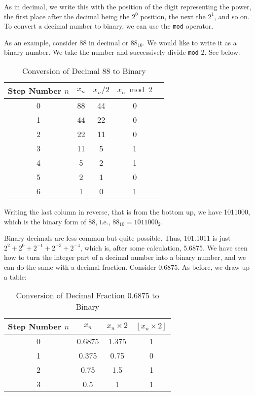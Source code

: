 As in decimal, we write this with the position of the digit representing the power, the first place after the decimal being the $2^0$ position, the next the $2^1$, and so on. To convert a decimal number to binary, we can use the \texttt{mod} operator.

As an example, consider 88 in decimal or $88_{10}$. We would like to write it as a binary number. We take the number and successively divide \texttt{mod} 2. See below:

\begin{table}[h!]
\centering
\renewcommand{\arraystretch}{1.4}
\begin{tabular}{|c|c|c|c|c|}
\hline 
Step Number $n$ & $x_n$ & $x_n / 2$ & $x_n \bmod 2$ \\ \hline
0 & 88 & 44 & 0 \\ 
1 & 44 & 22 & 0 \\
2 & 22 & 11 & 0 \\
3 & 11 & 5 & 1 \\
4 & 5 & 2 & 1 \\
5 & 2 & 1 & 0 \\
6 & 1 & 0 & 1 \\ \hline
\end{tabular}
\caption{Conversion of Decimal 88 to Binary}
\end{table}

Writing the last column in reverse, that is from the bottom up, we have 1011000, which is the binary form of 88, i.e., $88_{10} = 1011000_2$.

Binary decimals are less common but quite possible. Thus, 101.1011 is just $2^2 + 2^0 + 2^{-1} + 2^{-3} + 2^{-4}$, which is, after some calculation, 5.6875. We have seen how to turn the integer part of a decimal number into a binary number, and we can do the same with a decimal fraction. Consider 0.6875. As before, we draw up a table:

\begin{table}[h!]
\centering
\renewcommand{\arraystretch}{1.4}
\begin{tabular}{|c|c|c|c|}
\hline 
Step Number $n$ & $x_n$ & $x_n \times 2$ & $\left\lfloor x_n \times 2 \right\rfloor$ \\ \hline
0 & 0.6875 & 1.375 & 1 \\ \hline
1 & 0.375 & 0.75 & 0 \\ \hline
2 & 0.75 & 1.5 & 1 \\ \hline
3 & 0.5 & 1 & 1 \\ \hline
\end{tabular}
\caption{Conversion of Decimal Fraction 0.6875 to Binary}
\end{table}

